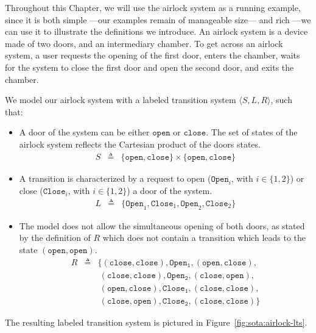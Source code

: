 Throughout this Chapter, we will use the airlock system  as a
running example, since it is both simple ---our examples remain of manageable
size--- and rich ---we can use it to illustrate the definitions we introduce.
%
An airlock system is a device made of two doors, and an intermediary chamber.
%
To get across an airlock system, a user requests the opening of the first door,
enters the chamber, waits for the system to close the first door and open the
second door, and exits the chamber.

\begin{example}
  \label{example:sota:airlocklts}

  We model our airlock system with a labeled transition system
  \( \langle S, L, R \rangle \), such that:

  \begin{itemize}
  \item A door of the system can be either \( \mathtt{open} \) or
    \( \mathtt{close} \).
    The set of states of the airlock system reflects the Cartesian product of
    the doors states.
    \[
      \begin{array}{rcl}
        S & \triangleq & \{ \mathtt{open}, \mathtt{close} \} \times \{ \mathtt{open},
                         \mathtt{close} \}
      \end{array}
    \]
  \item A transition is characterized by a request to open
    (\( \mathtt{Open}_i\), with \( i \in \{1, 2\} \)) or close
    (\( \mathtt{Close}_i \), with \( i \in \{1, 2\} \)) a door of the system.
    \[
      \begin{array}{rcl}
        L & \triangleq & \{ \mathtt{Open}_1, \mathtt{Close}_1, \mathtt{Open}_2,
                         \mathtt{Close}_2 \}
      \end{array}
    \]
  \item The model does not allow the simultaneous opening of both doors, as
    stated by the definition of \( R \) which does not contain a transition
    which leads to the state \( (\mathtt{open}, \mathtt{open}) \).
    \[
      \begin{array}{rcl}
        R & \triangleq & \{ (\mathtt{close}, \mathtt{close}), \mathtt{Open_1},
                         (\mathtt{open}, \mathtt{close}), \\
          & & \ (\mathtt{close}, \mathtt{close}), \mathtt{Open_2},
              (\mathtt{close}, \mathtt{open}), \\
          & & \ (\mathtt{open}, \mathtt{close}), \mathtt{Close_1},
              (\mathtt{close}, \mathtt{close}), \\
          & & \ (\mathtt{close}, \mathtt{open}), \mathtt{Close_2},
              (\mathtt{close}, \mathtt{close}) \}
      \end{array}
    \]
  \end{itemize}

  The resulting labeled transition system is pictured in
  Figure~\ref{fig:sota:airlock-lts}.
\end{example}

